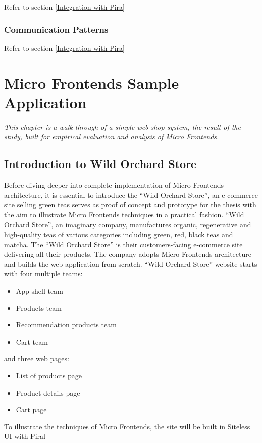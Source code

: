 \documentclass[a4paper]{book}
\begin{document}
Refer to section \ref{Integration with Pira}

\subsection{Communication Patterns}

Refer to section \ref{Integration with Pira}

\chapter{Micro Frontends Sample Application} \label{Micro Frontends Sample Application}
\textit{This chapter is a walk-through of a simple web shop system, the result of the study, built for empirical evaluation and analysis of Micro Frontends.}
\section{Introduction to Wild Orchard Store}

Before diving deeper into complete implementation of Micro Frontends architecture, it is essential to introduce the “Wild Orchard Store”, an e-commerce site selling green teas serves as proof of concept and prototype for the thesis with the aim to illustrate Micro Frontends techniques in a practical fashion. “Wild Orchard Store”, an imaginary company, manufactures organic, regenerative and high-quality teas of various categories including green, red, black teas and matcha. The “Wild Orchard Store” is their customers-facing e-commerce site delivering all their products. 
The company adopts Micro Frontends architecture and builds the web application from scratch. “Wild Orchard Store” website starts with four multiple teams:

\begin{itemize}
    \item App-shell team
    \item Products team
    \item Recommendation products team
    \item Cart team
\end{itemize}
and three web pages:

\begin{itemize}
    \item List of products page
    \item Product details page
    \item Cart page
\end{itemize}
To illustrate the techniques of Micro Frontends, the site will be built in Siteless UI with Piral
\end{document}
